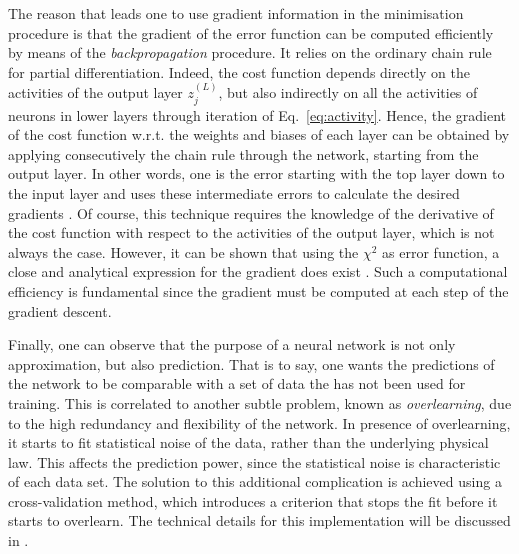 The reason that leads one to use gradient information in the minimisation procedure is that the gradient of the error function can be computed efficiently by means of the \textit{backpropagation} procedure. It relies on the ordinary chain rule for partial differentiation. Indeed, the cost function depends directly on the activities of the output layer $z_j^{(L)}$, but also indirectly on all the activities of neurons in lower layers through iteration of Eq.~\eqref{eq:activity}. Hence, the gradient of the cost function w.r.t. the weights and biases of each layer can be obtained by applying consecutively the chain rule through the network, starting from the output layer. In other words, one is  the error starting with the top layer down to the input layer and uses these intermediate errors to calculate the desired gradients \cite{HBLV}. Of course, this technique requires the knowledge of the derivative of the cost function with respect to the activities of the output layer, which is not always the case. However, it can be shown that using the $\chi^2$ as error function, a close and analytical expression for the gradient does exist \cite{AbdulKhalek:2020uza}. Such a computational efficiency is fundamental since the gradient must be computed at each step of the gradient descent.%

Finally, one can observe that the purpose of a neural network is not only approximation, but also prediction. That is to say, one wants the predictions of the network to be comparable with a set of data the has not been used for training. This is correlated to another subtle problem, known as \textit{overlearning}, due to the high redundancy and flexibility of the network. In presence of overlearning, it starts to fit statistical noise of the data, rather than the underlying physical law. This affects the prediction power, since the statistical noise is characteristic of each data set. The solution to this additional complication is achieved using a cross-validation method, which introduces a criterion that stops the fit before it starts to overlearn. The technical details for this implementation will be discussed in .


